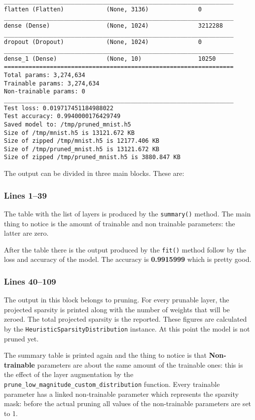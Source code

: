 \begin{lstlisting}[label={lst:mnistpipelineoutput},
    caption=MNIST pipeline output execution]
_________________________________________________________________
flatten (Flatten)            (None, 3136)              0
_________________________________________________________________
dense (Dense)                (None, 1024)              3212288
_________________________________________________________________
dropout (Dropout)            (None, 1024)              0
_________________________________________________________________
dense_1 (Dense)              (None, 10)                10250
=================================================================
Total params: 3,274,634
Trainable params: 3,274,634
Non-trainable params: 0
_________________________________________________________________
Test loss: 0.019717451184988022
Test accuracy: 0.9940000176429749
Saved model to: /tmp/pruned_mnist.h5
Size of /tmp/mnist.h5 is 13121.672 KB
Size of zipped /tmp/mnist.h5 is 12177.406 KB
Size of /tmp/pruned_mnist.h5 is 13121.672 KB
Size of zipped /tmp/pruned_mnist.h5 is 3880.847 KB
\end{lstlisting}

The output can be divided in three main blocks. These are:

\subsubsection{Lines 1--39}
The table with the list of layers is produced by the
\texttt{summary\string(\string)} method. The main thing to notice is the amount
of trainable and non trainable parameters: the latter are zero.

After the table there is the output produced by the
\texttt{fit\string(\string)} method follow by the loss and accuracy of the
model. The accuracy is \textbf{0.9915999} which is pretty good.

\subsubsection{Lines 40--109}
The output in this block belongs to pruning. For every prunable layer, the
projected sparsity is printed along with the number of weights that will be
zeroed. The total projected sparsity is the reported. These figures are
calculated by the \texttt{HeuristicSparsityDistribution} instance. At this
point the model is not pruned yet.

The summary table is printed again and the thing to notice is that
\textbf{Non-trainable} parameters are about the same amount of the trainable
ones: this is the effect of the layer augmentation by the \linebreak
\texttt{prune\_low\_magnitude\_custom\_distribution} function.
Every trainable parameter has a linked non-trainable parameter which represents
the sparsity mask: before the actual pruning all values of the non-trainable
parameters are set to 1.


